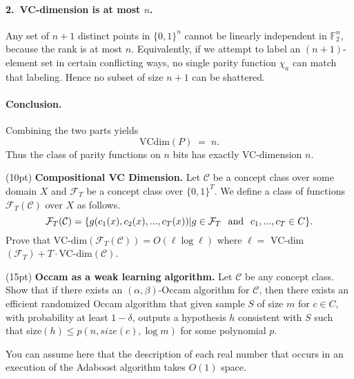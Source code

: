 \documentclass[11pt]{article}
\DeclareMathOperator{\1}{\mathbbm{1}}
\begin{document}
\paragraph{2.~VC-dimension is at most $n$.}
Any set of $n+1$ distinct points in $\{0,1\}^n$ cannot be linearly independent in $\mathbb{F}_2^n$, because the rank is at most $n$.  Equivalently, if we attempt to label an $(n+1)$-element set in certain conflicting ways, no single parity function $\chi_a$ can match that labeling.  Hence no subset of size $n+1$ can be shattered.

\paragraph{Conclusion.}
Combining the two parts yields
\[
\mathrm{VCdim}(P) \;=\; n.
\]
Thus the class of parity functions on $n$ bits has exactly VC-dimension $n$.

\begin{problem} (10pt) \textbf{Compositional VC Dimension.}
Let $\mathcal{C}$ be a concept class over some domain $X$ and $\mathcal{F}_T$ be a concept class over $\{0, 1\}^T$. We define a class of functions $\mathcal{F}_T(\mathcal{C})$ over $X$ as follows. 
\[\mathcal{F}_T(\mathcal{C}) = \{g(c_1(x), c_2(x), . . . , c_T(x)) | g \in \mathcal{F}_T \hspace{0.25cm} \text{\rm and} \hspace{0.25cm} c_1, . . . , c_T \in C\}.\] 
Prove that VC-dim$(\mathcal{F}_T(\mathcal{C})) = O(\ell \log \ell)$ where $\ell =$ VC-dim$(\mathcal{F}_T) + T \cdot $VC-dim$(\mathcal{C})$. 
\end{problem}



\begin{problem}(15pt) \textbf{Occam as a weak learning algorithm.} Let $\mathcal{C}$ be any concept class. Show that if there exists an $(\alpha, \beta)$-Occam algorithm for $\mathcal{C}$, then there exists an efficient randomized Occam algorithm that given sample $S$ of size $m$ for $c \in C$, with probability at least $1 - \delta$, outputs a hypothesis $h$ consistent with $S$ such that size$(h) \leq p(n,size(c), \log m)$ for some polynomial $p$.
\end{problem}

\begin{hint}
    You can assume here that the description of each real number that occurs in an execution of the Adaboost algorithm takes $O(1)$ space.
\end{hint}
\end{document}
